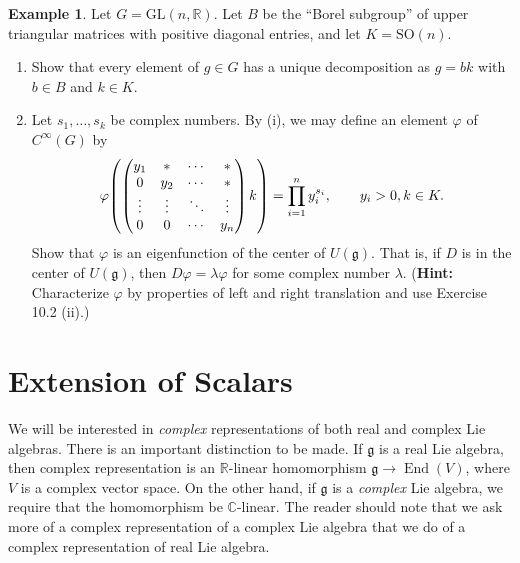 \documentclass[12pt,reqno]{book}%
\theoremstyle{definition}
\newtheorem{example}{Example}[chapter]
\theoremstyle{remark}
\theoremstyle{theorem}
\theoremstyle{remark}
\DeclareMathOperator{\End}{End}
\begin{document}
\begin{example}\label{}
    Let $G = \mathrm{GL}(n, \mathbb{R})$.
    Let $B$ be the ``Borel subgroup'' of upper triangular matrices with positive diagonal entries, and let $K = \mathrm{SO}(n)$.
    \begin{enumerate}[label=(\roman*),font=\normalfont,before=\normalfont]
        \item Show that every element of $g \in G$ has a unique decomposition as $g = bk$ with $b \in B$ and $k \in K$.
        \item Let $s_1, \ldots, s_k$ be complex numbers.
            By (i), we may define an element $\varphi$ of $C^{\infty}(G)$ by
            \[
                \varphi{\left(
                        \renewcommand\arraystretch{1}
                        \begin{pmatrix}
                            y_1 & * & \cdots & * \\ %
                            0 & y_2 & \cdots & * \\
                            \vdots & \vdots & \ddots & \vdots \\
                            0 & 0 & \cdots & y_n
                        \end{pmatrix}k\right)} = \prod_{i = 1}^{n} y_i^{s_i}, \qquad y_i > 0, k \in K.
            \]
            Show that $\varphi$ is an eigenfunction of the center of $U(\mathfrak{g})$.
            That is, if $D$ is in the center of $U(\mathfrak{g})$, then $D\varphi =  \lambda\varphi$ for some complex number $\lambda$.
            (\textbf{Hint:} Characterize $\varphi$ by properties of left and right translation and use Exercise 10.2 (ii).)
    \end{enumerate}
\end{example}


\chapter{Extension of Scalars}\label{}%
We will be interested in \emph{complex} representations of both real and complex Lie algebras.
There is an important distinction to be made.
If $\mathfrak{g}$ is a real Lie algebra, then complex representation is an $\mathbb{R}$-linear homomorphism $\mathfrak{g} \to \End(V)$, where $V$ is a complex vector space.
On the other hand, if $\mathfrak{g}$ is a \emph{complex} Lie algebra, we require that the homomorphism be $\mathbb{C}$-linear.
The reader should note that we ask more of a complex representation of a complex Lie algebra that we do of a complex representation of real Lie algebra.
\end{document}
